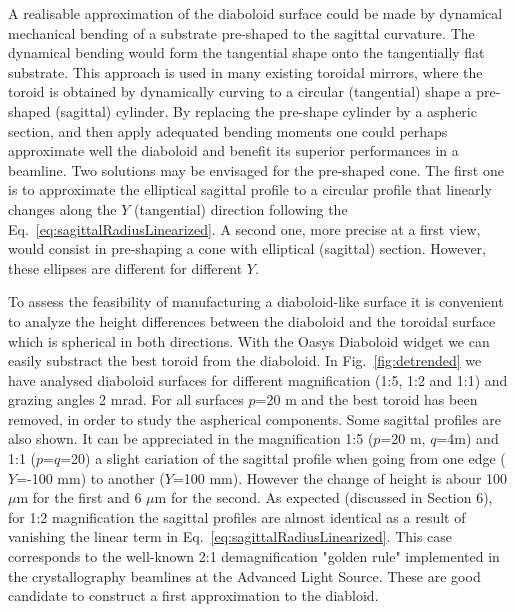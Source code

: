 \documentclass{iucr}              %
\begin{document}
A realisable approximation of the diaboloid surface could be made by dynamical mechanical bending of a substrate pre-shaped to the sagittal curvature. The dynamical bending would form the tangential shape onto the tangentially flat substrate. This approach is used in many existing toroidal mirrors, where the toroid is obtained by dynamically curving to a circular (tangential) shape a pre-shaped (sagittal) cylinder. By replacing the pre-shape cylinder by a aspheric section, and then apply adequated bending moments one could perhaps approximate well the diaboloid and benefit its superior performances in a beamline. Two solutions may be envisaged for the pre-shaped cone. The first one is to approximate the elliptical sagittal profile to a circular profile that linearly changes along the $Y$ (tangential) direction following the Eq.~\ref{eq:sagittalRadiusLinearized}. A second one, more precise at a first view, would consist in pre-shaping a cone with elliptical (sagittal) section. However, these ellipses are different for different $Y$. 


To assess the feasibility of manufacturing a diaboloid-like surface it is convenient to analyze the height differences between the diaboloid and the toroidal surface which is spherical in both directions. With the Oasys Diaboloid widget we can easily substract the best toroid from the diaboloid. In Fig.~\ref{fig:detrended} we have analysed diaboloid surfaces for different magnification (1:5, 1:2 and 1:1) and grazing angles 2 mrad. For all surfaces $p$=20 m and the best toroid has been removed, in order to study the aspherical components. Some sagittal profiles are also shown. It can be appreciated in the magnification 1:5 ($p$=20 m, $q$=4m) and 1:1 ($p$=$q$=20) a slight cariation of the sagittal profile when going from one edge ($Y$=-100 mm) to another ($Y$=100 mm). However the change of height is abour 100 $\mu$m for the first and 6 $\mu$m for the second. As expected (discussed in \cite{part2} Section 6), for 1:2 magnification the sagittal profiles are almost identical as a result of vanishing the linear term in Eq.~\ref{eq:sagittalRadiusLinearized}. This case corresponds to the well-known 2:1 demagnification "golden rule" implemented in the crystallography beamlines at the Advanced Light
Source. These are good candidate to construct a first approximation to the diabloid. 
\end{document}
